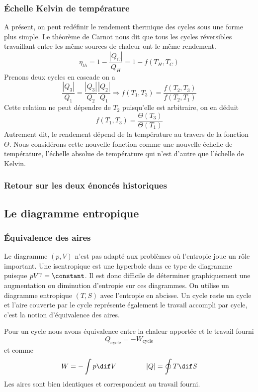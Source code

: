 \subsubsection{Échelle Kelvin de température}
A présent, on peut redéfinir le rendement thermique
des cycles sous une forme plus simple.
Le théorème de Carnot nous dit que tous les cycles réversibles travaillant
entre les même sources de chaleur ont le même rendement.
\[ \eta_{th} = 1-\frac{|Q_C|}{Q_H} = 1-f(T_H,T_C) \]
Prenons deux cycles en cascade on a
\[ \frac{|Q_3|}{Q_1} = \frac{|Q_3|}{Q_2}\frac{|Q_2|}{Q_1}
\Rightarrow f(T_1,T_3) = \frac{f(T_2,T_3)}{f(T_2,T_1)} \]
Cette relation ne peut dépendre de $T_2$ puisqu'elle est arbitraire,
on en déduit
\[ f(T_1,T_3) = \frac{\Theta (T_3)}{\Theta (T_1)} \]
Autrement dit, le rendement dépend de la température
au travers de la fonction $\Theta$.
Nous considérons cette nouvelle fonction comme une
nouvelle échelle de température, l'échelle absolue de température
qui n'est d'autre que l'échelle de Kelvin.

\subsubsection{Retour sur les deux énoncés historiques}

\subsection{Le diagramme entropique}
\subsubsection{Équivalence des aires}
Le diagramme $(p,V)$ n'est pas adapté aux problèmes
où l'entropie joue un rôle important.
Une isentropique est une hyperbole dans ce type
de diagramme puisque $pV^{\gamma} = \constant$.
Il est donc difficile de déterminer graphiquement une
augmentation ou diminution d'entropie sur ces diagrammes.
On utilise un diagramme entropique $(T,S)$ avec l'entropie en abcisse.
Un cycle reste un cycle et l'aire couverte par le cycle représente
également le travail accompli par cycle,
c'est la notion d'équivalence des aires.

Pour un cycle nous avons équivalence entre la chaleur
apportée et le travail fourni
\[ Q_\mathrm{cycle} = -W_\mathrm{cycle} \]
et comme
\[ W = -\int p\dif V \hspace{1.5cm} |Q| = \oint T\dif S \]
Les aires sont bien identiques et correspondent au travail fourni.

